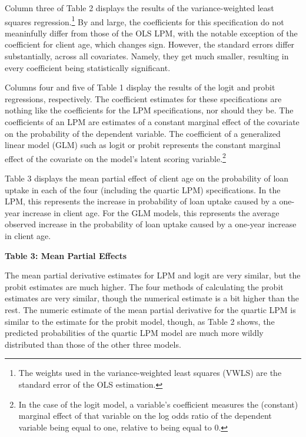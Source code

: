 \documentclass{article}
\begin{document}
Column three of Table 2 displays the results of the variance-weighted least squares regression.\footnote{The weights used in the variance-weighted least squares (VWLS) are the standard error of the OLS estimation.} By and large, the coefficients for this specification do not meaninfully differ from those of the OLS LPM, with the notable exception of the coefficient for client age, which changes sign. However, the standard errors differ substantially, across all covariates. Namely, they get much smaller, resulting in every coefficient being statistically significant.

Columns four and five of Table 1 display the results of the logit and probit regressions, respectively. The coefficient estimates for these specifications are nothing like the coefficients for the LPM specifications, nor should they be. The coefficients of an LPM are estimates of a constant marginal effect of the covariate on the probability of the dependent variable. The coefficient of a generalized linear model (GLM) such as logit or probit represents the constant marginal effect of the covariate on the model's latent scoring variable.\footnote{In the case of the logit model, a variable's coefficient measures the (constant) marginal effect of that variable on the log odds ratio of the dependent variable being equal to one, relative to being equal to 0.}

Table 3 displays the mean partial effect of client age on the probability of loan uptake in each of the four (including the quartic LPM) specifications. In the LPM, this represents the increase in probability of loan uptake caused by a one-year increase in client age. For the GLM models, this represents the average observed increase in the probability of loan uptake caused by a one-year increase in client age.
\begin{center}
        \textbf{Table 3: Mean Partial Effects} \\\medskip
        
\end{center}

The mean partial derivative estimates for LPM and logit are very similar, but the probit estimates are much higher. The four methods of calculating the probit estimates are very similar, though the numerical estimate is a bit higher than the rest. The numeric estimate of the mean partial derivative for the quartic LPM is similar to the estimate for the probit model, though, as Table 2 shows, the predicted probabilities of the quartic LPM model are much more wildly distributed than those of the other three models.
\end{document}
